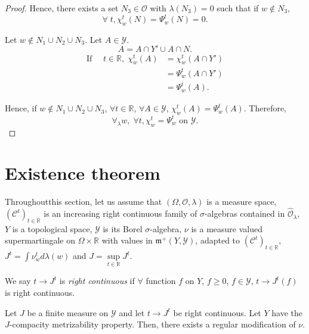 \begin{proof}
Hence, there exists a set $N_3 \in \mathscr{O}$ with $\lambda(N_3) =0$
such that if $w \not\in N_3$,
$$
\forall \; t , \chi^t_w(N) = \Psi^t_w(N) = 0.
$$ 

Let $w \not\in N_1 \cup N_2 \cup N_3$. Let $A \in \mathscr{Y}$.
$$
A = A \cap Y' \cup A \cap N. 
$$
\begin{align*}
\text{If } \quad t \in \mathbb{R}, \; \chi^t_w(A) & = \chi^t_w(A \cap
Y')\\
& = \Psi^t_w(A \cap Y')\\
& = \Psi^t_w(A). 
\end{align*}

Hence, if $w \not\in N_1 \cup N_2 \cup N_3$, $\forall t \in
\mathbb{R}$, $\forall A \in \mathscr{Y}$, $\chi^t_w(A) =
\Psi^t_w(A)$. Therefore,
$$
\forall_\lambda w, \; \forall t, \chi^t_w = \Psi^t_w \text{ on }
\mathscr{Y}. 
$$
\end{proof}


\section{Existence theorem}\label{part2:chap5:sec2}

Throughout\pageoriginale this section, let us assume that $(\Omega,
\mathscr{O}, \lambda)$ is a measure space, $(\mathscr{C}^t)_{t \in
  \mathbb{R}}$ is an increasing right continuous family of
$\sigma$-algebras contained in $\hat{\mathscr{O}}_\lambda$, $Y$ is a
topological space, $\mathscr{Y}$ is its Borel $\sigma$-algebra, $\nu$
is a measure valued supermartingale on $\Omega \times \mathbb{R}$ with
values in $\mathfrak{m}^+(Y, \mathscr{Y})$, adapted to
$(\mathscr{C}^t)_{t \in \mathbb{R}}$, $J^t = \int \nu^t_w d\lambda
(w)$ and $J = \sup\limits_{t \in \mathbb{R}} J^t$.  

\begin{defn}\label{part2:chap5:def77}
We say $t \to J^t$ is {\em right continuous} if $\forall$ function $f$
on $Y$, $f \geq 0$, $f \in \mathscr{Y}$, $t \to J^t(f)$ is right
continuous. 
\end{defn}

\begin{thm}[Existence]\label{part2:chap5:thm78}
Let $J$ be a finite measure on $\mathscr{Y}$ and let $t \to J^t$ be
right continuous. Let $Y$ have the $J$-compacity metrizability
property. Then, there exists a regular modification of $\nu$. 
\end{thm}

